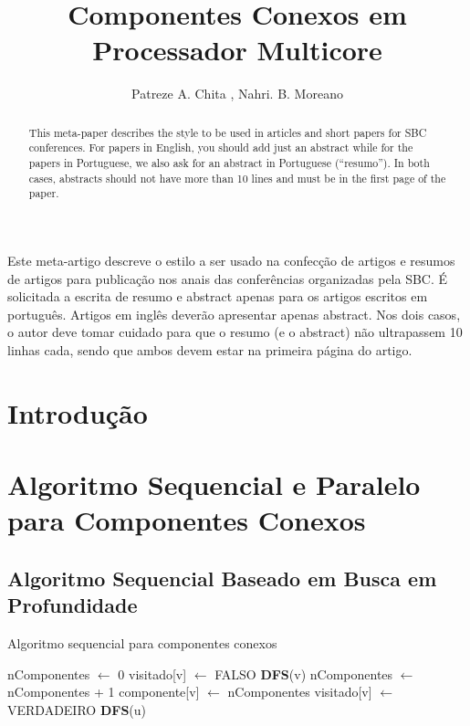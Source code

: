 \documentclass[12pt]{article}
\title{Componentes Conexos em Processador Multicore}
\author{Patreze A. Chita \inst{1}, Nahri. B. Moreano\inst{1}}
\begin{document}
 

\maketitle

\begin{abstract}
  This meta-paper describes the style to be used in articles and short papers
  for SBC conferences. For papers in English, you should add just an abstract
  while for the papers in Portuguese, we also ask for an abstract in
  Portuguese (``resumo''). In both cases, abstracts should not have more than
  10 lines and must be in the first page of the paper.
\end{abstract}
     
\begin{resumo} 
  Este meta-artigo descreve o estilo a ser usado na confecção de artigos e
  resumos de artigos para publicação nos anais das conferências organizadas
  pela SBC. É solicitada a escrita de resumo e abstract apenas para os artigos
  escritos em português. Artigos em inglês deverão apresentar apenas abstract.
  Nos dois casos, o autor deve tomar cuidado para que o resumo (e o abstract)
  não ultrapassem 10 linhas cada, sendo que ambos devem estar na primeira
  página do artigo.
\end{resumo}

\section{Introdução}
{\color{gray}\lipsum[1]}

\section{Algoritmo Sequencial e Paralelo para Componentes Conexos}
{\color{gray}\lipsum[1]}

\subsection{Algoritmo Sequencial Baseado em Busca em Profundidade}

{\color{gray}\lipsum[1]}

\begin{algorithm}[h]
    \DontPrintSemicolon
    \caption{Algoritmo sequencial para componentes conexos}
	{
        nComponentes $\gets$ 0\;
        {
            visitado[v] $\gets$ FALSO\;
        }
        {
            {
                \textbf{DFS}(v)\;
                nComponentes $\gets$ nComponentes + 1\;
            }
        }
    }
    {
        componente[v] $\gets$ nComponentes\; 
        visitado[v] $\gets$ VERDADEIRO\;
        {
            {
                \textbf{DFS}(u)\;
            }
        }
    }
\end{algorithm}
\end{document}
